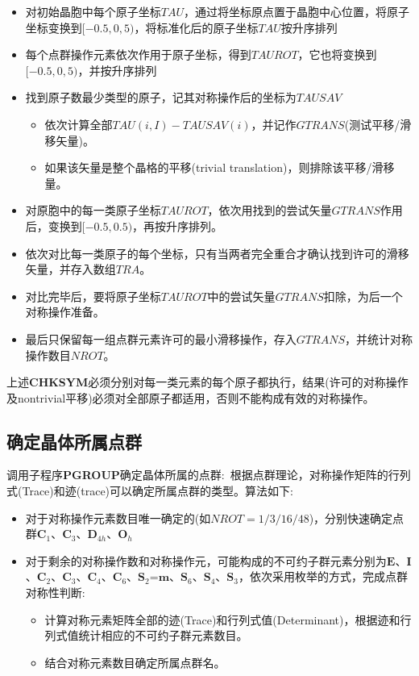 \documentclass{article}      %
\begin{document}
\begin{itemize}
	\item 对初始晶胞中每个原子坐标$\mathit{TAU}$，通过将坐标原点置于晶胞中心位置，将原子坐标变换到$[-0.5,0,5)$，将标准化后的原子坐标$\mathit{TAU}$按升序排列
	\item 每个点群操作元素依次作用于原子坐标，得到$\mathit{TAUROT}$，它也将变换到$[-0.5,0,5)$，并按升序排列
	\item 找到原子数最少类型的原子，记其对称操作后的坐标为$\mathit{TAUSAV}$
		\begin{itemize}
			\item 依次计算全部$\mathit{TAU}(i,I)-\mathit{TAUSAV(i)}$，并记作$\mathit{GTRANS}$(测试平移/滑移矢量)。
			\item 如果该矢量是整个晶格的平移(\textrm{trivial translation})，则排除该平移/滑移量。
		\end{itemize}
	\item 对原胞中的每一类原子坐标$TAUROT$，依次用找到的尝试矢量$\mathit{GTRANS}$作用后，变换到$[-0.5,0.5)$，再按升序排列。
	\item 依次对比每一类原子的每个坐标，只有当两者完全重合才确认找到许可的滑移矢量，并存入数组$\mathit{TRA}$。
	\item 对比完毕后，要将原子坐标$TAUROT$中的尝试矢量$\mathit{GTRANS}$扣除，为后一个对称操作准备。
	\item 最后只保留每一组点群元素许可的最小滑移操作，存入$\mathit{GTRANS}$，并统计对称操作数目$\mathit{NROT}$。
\end{itemize}
上述\textbf{CHKSYM}必须分别对每一类元素的每个原子都执行，结果(许可的对称操作及nontrivial平移)必须对全部原子都适用，否则不能构成有效的对称操作。

\subsection{确定晶体所属点群}
调用子程序\textbf{PGROUP}确定晶体所属的点群:~根据点群理论，对称操作矩阵的行列式(\textrm{Trace})和迹(\textrm{trace})可以确定所属点群的类型。算法如下:~
\begin{itemize}
	\item 对于对称操作元素数目唯一确定的(如$\mathit{NROT}=1/3/16/48$)，分别快速确定点群$\mathbf{C}_1$、$\mathbf{C}_3$、$\mathbf{D}_{4h}$、$\mathbf{O}_h$
	\item 对于剩余的对称操作数和对称操作元，可能构成的不可约子群元素分别为$\mathbf{E}$、$\mathbf{I}$、$\mathbf{C}_2$、$\mathbf{C}_3$、$\mathbf{C}_4$、$\mathbf{C}_6$、$\mathbf{S}_2$=$\mathbf{m}$、$\mathbf{S}_6$、$\mathbf{S}_4$、$\mathbf{S}_3$，依次采用枚举的方式，完成点群对称性判断:~
		\begin{itemize}
			\item 计算对称元素矩阵全部的迹(\textrm{Trace})和行列式值(\textrm{Determinant})，根据迹和行列式值统计相应的不可约子群元素数目。
			\item 结合对称元素数目确定所属点群名。
		\end{itemize}
\end{itemize}
\end{document}
